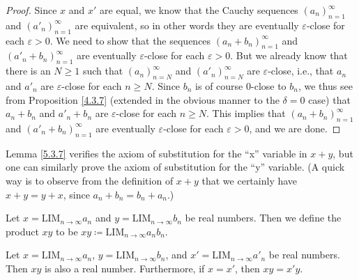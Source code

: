 \begin{proof}
Since \(x\) and \(x'\) are equal, we know that the Cauchy sequences \((a_n)_{n = 1}^{\infty}\) and \((a'_n)_{n = 1}^{\infty}\) are equivalent, so in other words they are eventually \(\varepsilon\)-close for each \(\varepsilon > 0\).
We need to show that the sequences \((a_n + b_n)_{n = 1}^{\infty}\) and \((a'_n + b_n)_{n = 1}^{\infty}\) are eventually \(\varepsilon\)-close for each \(\varepsilon > 0\).
But we already know that there is an \(N \geq 1\) such that \((a_n)_{n = N}^{\infty}\) and \((a'_n)_{n = N}^{\infty}\) are \(\varepsilon\)-close, i.e., that \(a_n\) and \(a'_n\) are \(\varepsilon\)-close for each \(n \geq N\).
Since \(b_n\) is of course \(0\)-close to \(b_n\), we thus see from Proposition \ref{4.3.7} (extended in the obvious manner to the \(\delta = 0\) case) that \(a_n + b_n\) and \(a'_n + b_n\) are \(\varepsilon\)-close for each \(n \geq N\).
This implies that \((a_n + b_n)_{n = 1}^{\infty}\) and \((a'_n + b_n)_{n = 1}^{\infty}\) are eventually \(\varepsilon\)-close for each \(\varepsilon > 0\), and we are done.
\end{proof}

\begin{remark}\label{5.3.8}
Lemma \ref{5.3.7} verifies the axiom of substitution for the ``x'' variable in \(x + y\), but one can similarly prove the axiom of substitution for the ``y'' variable.
(A quick way is to observe from the definition of \(x + y\) that we certainly have \(x + y = y + x\), since \(a_n + b_n = b_n + a_n\).)
\end{remark}

\begin{definition}\label{5.3.9}
Let \(x = \text{LIM}_{n \to \infty} a_n\) and \(y = \text{LIM}_{n \to \infty} b_n\) be real numbers.
Then we define the product \(xy\) to be \(xy \coloneqq \text{LIM}_{n \to \infty} a_n b_n\).
\end{definition}

\begin{proposition}\label{5.3.10}
Let \(x = \text{LIM}_{n \to \infty} a_n\), \(y = \text{LIM}_{n \to \infty} b_n\), and \(x' = \text{LIM}_{n \to \infty} a'_n\) be real numbers.
Then \(xy\) is also a real number.
Furthermore, if \(x = x'\), then \(xy = x'y\).
\end{proposition}

